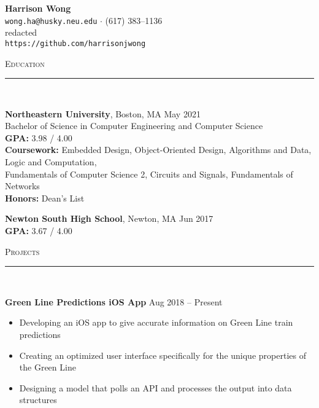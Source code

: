 \documentclass[11pt]{article}
\begin{document}
\small
\center
	\textbf{\huge Harrison Wong}  \\
	\vspace{0.05in}
	\texttt{wong.ha@husky.neu.edu} $\cdot$ (617) 383--1136 \\
	redacted \\
	\texttt{https://github.com/harrisonjwong} \\
	\vspace{0.2in}
	
\begin{raggedright}

	\textsc{\Large Education} \\
	\vspace{-0.1in}
	\rule{\textwidth}{0.4pt} \\
	\vspace{0.05in}

	\textbf{\large Northeastern University}, Boston, MA 
	\hfill May 2021 \\
	Bachelor of Science in Computer Engineering and Computer Science \\
	\textbf{GPA:} 3.98 / 4.00 \\
	\textbf{Coursework:} Embedded Design, Object-Oriented Design, Algorithms and Data, Logic and Computation, \\
	\hspace{64pt} Fundamentals of Computer Science 2, Circuits and Signals, Fundamentals of Networks \\
	\textbf{Honors:} Dean's List
	\vspace{0.1in}
	
	\textbf{\large Newton South High School}, Newton, MA
	\hfill Jun 2017 \\
	\textbf{GPA:} 3.67 / 4.00 \\
	\vspace{0.2in}
	
	\textsc{\Large Projects} \\
	\vspace{-0.1in}
	\rule{\textwidth}{0.4pt} \\
	\vspace{0.05in}
	
	\textbf{\large Green Line Predictions iOS App} 
	\hfill Aug 2018 -- Present 
	\begin{itemize}
		\item Developing an iOS app to give accurate information on Green Line train predictions
		\item Creating an optimized user interface specifically for the unique properties of the Green Line
		\item Designing a model that polls an API and processes the output into data structures
	\end{itemize}
	\vspace{0.1in}
	

\end{raggedright}
\end{document}
